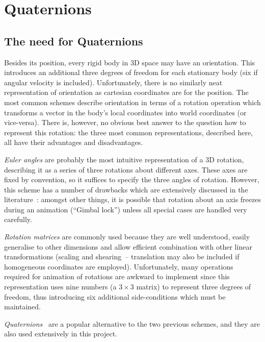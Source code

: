 \section{Quaternions}
\subsection{The need for Quaternions}
Besides its position, every rigid body in 3D space may have an orientation. This introduces an
additional three degrees of freedom for each stationary body (six if
angular velocity is included). Unfortunately, there is no similarly neat representation of
orientation as cartesian coordinates are for the position. The most common schemes describe
orientation in terms of a rotation operation which transforms a vector in the body's local
coordinates into world coordinates (or vice-versa). There is, however, no obvious best
answer to the question how to represent this rotation: the three most common representations,
described here, all have their advantages and disadvantages.

{\em Euler angles} are probably the most intuitive representation of a 3D rotation, describing
it as a series of three rotations about different axes. These axes are fixed by convention, so it
suffices to specify the three angles of rotation. However, this scheme has a number of drawbacks
which are extensively discussed in the literature~\cite{Saunders:PhD,Shoemake:85}: amongst other
things, it is possible that rotation about an axis freezes during an animation (``Gimbal lock'')
unless all special cases are handled very carefully.

{\em Rotation matrices} are commonly used because they are well understood, easily generalise
to other dimensions and allow efficient combination with other linear transformations (scaling
and shearing~-- translation may also be included if homogeneous coordinates are employed).
Unfortunately, many operations required for animation of rotations are awkward to implement
since this representation uses nine numbers (a $3\times3$ matrix) to represent three degrees
of freedom, thus introducing six additional side-conditions which must be maintained.

{\em Quaternions}~\cite{Shoemake:85,Eberly:01,MathWorld:Quaternion} are a popular alternative
to the two previous schemes, and they are also used extensively in this project.


